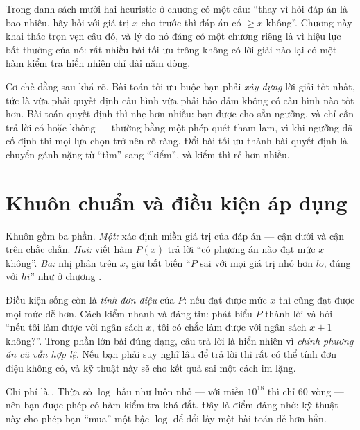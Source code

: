 \documentclass[../../algorithm.tex]{subfiles}
\begin{document}
Trong danh sách mười hai heuristic ở chương  có một câu: ``thay vì hỏi đáp án là bao nhiêu, hãy hỏi với giá trị \(x\) cho trước thì đáp án có \(\ge x\) không''. Chương này khai thác trọn vẹn câu đó, và lý do nó đáng có một chương riêng là vì hiệu lực bất thường của nó: rất nhiều bài tối ưu trông không có lời giải nào lại có một hàm kiểm tra hiển nhiên chỉ dài năm dòng.

Cơ chế đằng sau khá rõ. Bài toán tối ưu buộc bạn phải \emph{xây dựng} lời giải tốt nhất, tức là vừa phải quyết định cấu hình vừa phải bảo đảm không có cấu hình nào tốt hơn. Bài toán quyết định thì nhẹ hơn nhiều: bạn được cho sẵn ngưỡng, và chỉ cần trả lời có hoặc không --- thường bằng một phép quét tham lam, vì khi ngưỡng đã cố định thì mọi lựa chọn trở nên rõ ràng. Đổi bài tối ưu thành bài quyết định là chuyển gánh nặng từ ``tìm'' sang ``kiểm'', và kiểm thì rẻ hơn nhiều.

\section{Khuôn chuẩn và điều kiện áp dụng}

Khuôn gồm ba phần. \emph{Một:} xác định miền giá trị của đáp án --- cận dưới và cận trên chắc chắn. \emph{Hai:} viết hàm \(P(x)\) trả lời ``có phương án nào đạt mức \(x\) không''. \emph{Ba:} nhị phân trên \(x\), giữ bất biến ``\(P\) sai với mọi giá trị nhỏ hơn \(lo\), đúng với \(hi\)'' như ở chương .

Điều kiện sống còn là \emph{tính đơn điệu} của \(P\): nếu đạt được mức \(x\) thì cũng đạt được mọi mức dễ hơn. Cách kiểm nhanh và đáng tin: phát biểu \(P\) thành lời và hỏi ``nếu tôi làm được với ngân sách \(x\), tôi có chắc làm được với ngân sách \(x+1\) không?''. Trong phần lớn bài đúng dạng, câu trả lời là hiển nhiên vì \emph{chính phương án cũ vẫn hợp lệ}. Nếu bạn phải suy nghĩ lâu để trả lời thì rất có thể tính đơn điệu không có, và kỹ thuật này sẽ cho kết quả sai một cách im lặng.

Chi phí là . Thừa số \(\log\) hầu như luôn nhỏ --- với miền \(10^{18}\) thì chỉ 60 vòng --- nên bạn được phép có hàm kiểm tra khá đắt. Đây là điểm đáng nhớ: kỹ thuật này cho phép bạn ``mua'' một bậc \(\log\) để đổi lấy một bài toán dễ hơn hẳn.
\end{document}

